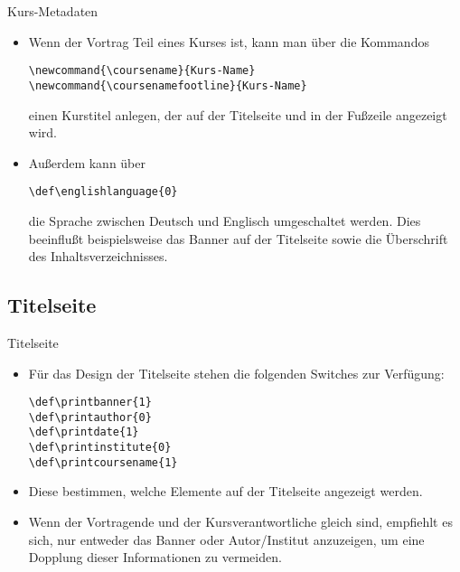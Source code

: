 \documentclass[hyperref={bookmarks=false},11pt,dvipsnames]{beamer}
\begin{document}
\begin{frame}[t]{Kurs-Metadaten}
	\begin{itemize}
		\item Wenn der Vortrag Teil eines Kurses ist, kann man über die Kommandos

		      \begin{alltt}
			      \textbackslash{}newcommand\{\textbackslash{}coursename\}\{Kurs-Name\}\\
			      \textbackslash{}newcommand\{\textbackslash{}coursenamefootline\}\{Kurs-Name\}
		      \end{alltt}

		      einen Kurstitel anlegen, der auf der Titelseite und in der Fußzeile angezeigt wird.

		\item Außerdem kann über
		      \begin{alltt}
			      \textbackslash{}def\textbackslash{}englishlanguage\{0\}
		      \end{alltt}
		      die Sprache zwischen Deutsch und Englisch umgeschaltet werden. Dies beeinflußt beispielsweise das Banner auf der Titelseite sowie die Überschrift des Inhaltsverzeichnisses.
	\end{itemize}

\end{frame}

\subsection{Titelseite}

\begin{frame}[t]{Titelseite}
	\begin{itemize}
		\item Für das Design der Titelseite stehen die folgenden Switches zur Verfügung:

		      \begin{alltt}
			      \textbackslash{}def\textbackslash{}printbanner\{1\}\\
			      \textbackslash{}def\textbackslash{}printauthor\{0\}\\
			      \textbackslash{}def\textbackslash{}printdate\{1\}\\
			      \textbackslash{}def\textbackslash{}printinstitute\{0\}\\
			      \textbackslash{}def\textbackslash{}printcoursename\{1\}\\
		      \end{alltt}

		\item Diese bestimmen, welche Elemente auf der Titelseite angezeigt werden.

		\item Wenn der Vortragende und der Kursverantwortliche gleich sind, empfiehlt es sich, nur entweder das Banner oder Autor/Institut anzuzeigen, um eine Dopplung dieser Informationen zu vermeiden.
	\end{itemize}

\end{frame}
\end{document}
